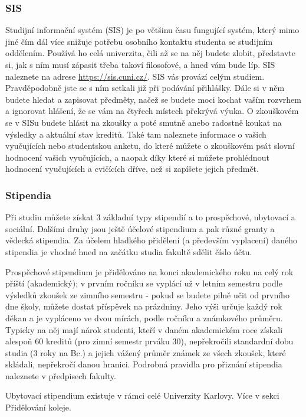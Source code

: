 \subsubsection{SIS}
Studijní informační systém (SIS) je po většinu času fungující systém, který mimo
jiné čím dál více snižuje potřebu osobního kontaktu studenta se studijním
oddělením. Používá ho celá univerzita, čili až se na něj budete zlobit,
představte si, jak s ním musí zápasit třeba takoví filosofové, a hned vám bude
líp. SIS naleznete na adrese \url{https://sis.cuni.cz/}.
SIS vás provází celým studiem. Pravděpodobně jste se s ním setkali již při
podávání přihlášky. Dále si v něm budete hledat a zapisovat předměty, načež se
budete moci kochat vaším rozvrhem a ignorovat hlášení, že se vám na čtyřech
místech překrývá výuka. O zkouškovém se v SISu budete hlásit na zkoušky a poté
smutně anebo radostně koukat na výsledky a aktuální stav kreditů. Také tam
naleznete informace o vašich vyučujících nebo studentskou anketu, do které
můžete o zkouškovém psát slovní hodnocení vašich vyučujících, a naopak díky
které si můžete prohlédnout hodnocení vyučujících a cvičících dříve, než si
zapíšete jejich předmět.


\subsubsection{Stipendia}
Při studiu můžete získat 3 základní typy stipendií a to prospěchové, ubytovací a
sociální. Dalšími druhy jsou ještě účelové stipendium a pak různé granty a
vědecká stipendia. Za účelem hladkého přidělení (a především vyplacení) daného
stipendia je vhodné hned na začátku studia fakultě sdělit číslo účtu.

Prospěchové stipendium je přidělováno na konci akademického roku na celý rok
příští (akademický); v prvním ročníku se vyplácí už v letním semestru podle
výsledků zkoušek ze zimního semestru - pokud se budete pilně učit od prvního dne
školy, můžete dostat příspěvek na prázdniny. Jeho výši určuje každý rok děkan a
je vypláceno ve dvou mírách, podle ročníku a známkového průměru. Typicky na něj
mají nárok studenti, kteří v daném akademickém roce získali alespoň 60 kreditů
(pro zimní semestr prváku 30), nepřekročili standardní dobu studia (3 roky na
Bc.) a jejich vážený průměr známek ze všech zkoušek, které skládali, nepřekročí
danou hranici. Podrobná pravidla pro přiznání stipendia naleznete v předpisech
fakulty.

Ubytovací stipendium existuje v rámci celé Univerzity Karlovy. Více v sekci
Přidělování koleje.

